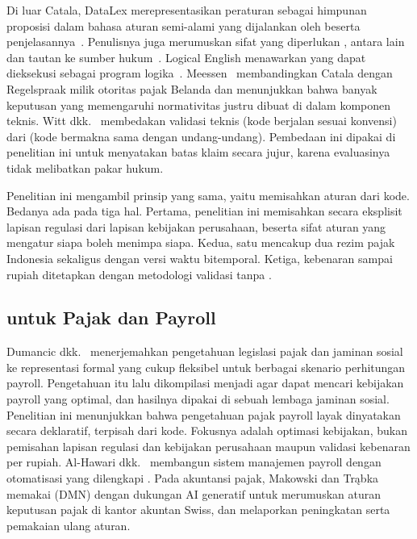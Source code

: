 Di luar Catala, DataLex merepresentasikan peraturan sebagai himpunan proposisi dalam bahasa aturan semi-alami yang dijalankan oleh  beserta penjelasannya~\cite{mowbray2023scaling}. Penulisnya juga merumuskan sifat  yang diperlukan , antara lain  dan tautan ke sumber hukum~\cite{mowbray2023xai}. Logical English menawarkan  yang dapat dieksekusi sebagai program logika~\cite{kowalski2022logicalenglish}. Meessen~\cite{meessen2023arrows} membandingkan Catala dengan Regelspraak milik otoritas pajak Belanda dan menunjukkan bahwa banyak keputusan yang memengaruhi normativitas justru dibuat di dalam komponen teknis. Witt dkk.~\cite{witt2024encoding} membedakan validasi teknis (kode berjalan sesuai konvensi) dari  (kode bermakna sama dengan undang-undang). Pembedaan ini dipakai di penelitian ini untuk menyatakan batas klaim secara jujur, karena evaluasinya tidak melibatkan pakar hukum.

Penelitian ini mengambil prinsip yang sama, yaitu memisahkan aturan dari kode. Bedanya ada pada tiga hal. Pertama, penelitian ini memisahkan secara eksplisit lapisan regulasi dari lapisan kebijakan perusahaan, beserta sifat aturan yang mengatur siapa boleh menimpa siapa. Kedua, satu  mencakup dua rezim pajak Indonesia sekaligus dengan versi waktu bitemporal. Ketiga, kebenaran sampai rupiah ditetapkan dengan metodologi validasi tanpa .

\subsection{ untuk Pajak dan Payroll}

Dumancic dkk.~\cite{dumancic2021payroll} menerjemahkan pengetahuan legislasi pajak dan jaminan sosial ke representasi formal yang cukup fleksibel untuk berbagai skenario perhitungan payroll. Pengetahuan itu lalu dikompilasi menjadi  agar  dapat mencari kebijakan payroll yang optimal, dan hasilnya dipakai di sebuah lembaga jaminan sosial. Penelitian ini menunjukkan bahwa pengetahuan pajak payroll layak dinyatakan secara deklaratif, terpisah dari kode. Fokusnya adalah optimasi kebijakan, bukan pemisahan lapisan regulasi dan kebijakan perusahaan maupun validasi kebenaran per rupiah. Al-Hawari dkk.~\cite{alhawari2026payroll} membangun sistem manajemen payroll dengan otomatisasi  yang dilengkapi  . Pada akuntansi pajak, Makowski dan Tr\k{a}bka~\cite{makowski2025dmn} memakai  (DMN) dengan dukungan AI generatif untuk merumuskan aturan keputusan pajak di kantor akuntan Swiss, dan melaporkan peningkatan  serta pemakaian ulang aturan.

